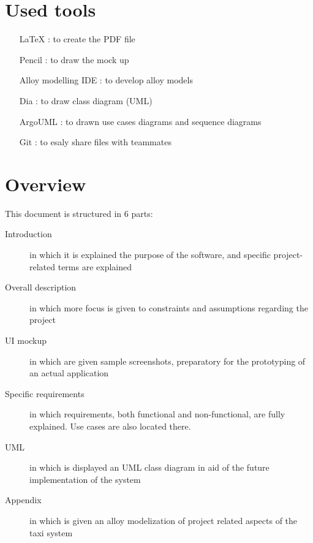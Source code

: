 \section{Used tools}
\begin{itemize}
 \item [LaTeX]: to create the PDF file 
 \item [Pencil]: to draw the mock up
 \item [Alloy modelling IDE]: to develop alloy models
 \item [Dia]: to draw class diagram (UML)
 \item [ArgoUML]: to drawn use cases diagrams and sequence diagrams
 \item [Git]: to esaly share files with teammates
\end{itemize}

\section{Overview}

This document is structured in 6 parts:

\begin{description}
 \item [Introduction] in which it is explained the purpose of the software, and specific project-related terms are explained
 \item [Overall description] in which more focus is given to constraints and assumptions regarding the project
 \item [UI mockup] in which are given sample screenshots, preparatory for the prototyping of an actual application 
 \item [Specific requirements] in which requirements, both functional and non-functional, are fully explained.
 Use cases are also located there.
 \item [UML] in which is displayed an UML class diagram in aid of the future implementation of the system
 \item [Appendix] in which is given an alloy modelization of project related aspects of the taxi system
 
\end{description}
